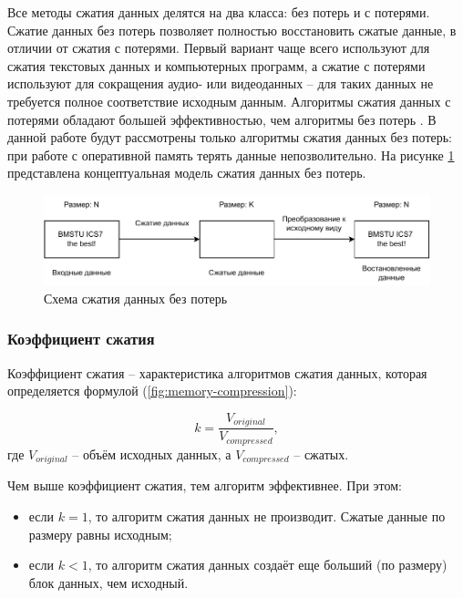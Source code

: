 Все методы сжатия данных делятся на два класса: без потерь и с потерями. Сжатие данных без потерь позволяет полностью восстановить сжатые данные, в отличии от сжатия с потерями. Первый вариант чаще всего используют для сжатия текстовых данных и компьютерных программ, а сжатие с потерями используют для сокращения аудио- или видеоданных -- для таких данных не требуется полное соответствие исходным данным. Алгоритмы сжатия данных с потерями обладают большей эффективностью, чем алгоритмы без потерь \cite{lossless-compression}. В данной работе будут рассмотрены только алгоритмы сжатия данных без потерь: при работе с оперативной память терять данные непозволительно. На рисунке \ref{fig:conceptual-compressor} представлена концептуальная модель сжатия данных без потерь.

\begin{figure}[h]
	\centering
	\includegraphics[width=\textwidth]{img/conceptual_compressor.pdf}
	\caption{Схема сжатия данных без потерь}
	\label{fig:conceptual-compressor}
\end{figure}

\subsubsection{Коэффициент сжатия}

Коэффициент сжатия -- характеристика алгоритмов сжатия данных, которая определяется формулой (\ref{fig:memory-compression}): 

\begin{equation}\label{fig:memory-compression}
	k = \frac{V_{original}}{V_{compressed}},
\end{equation}
где $V_{original}$ -- объём исходных данных, а $V_{compressed}$ -- сжатых.

Чем выше коэффициент сжатия, тем алгоритм эффективнее. При этом:

\begin{itemize}
	\item если $k = 1$, то алгоритм сжатия данных не производит. Сжатые данные по размеру равны исходным;
	\item если $k < 1$, то алгоритм сжатия данных создаёт еще больший (по размеру) блок данных, чем исходный.
\end{itemize}

